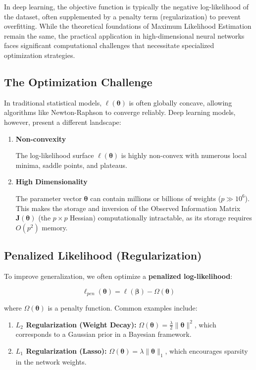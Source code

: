 \documentclass[
  letterpaper,
  DIV=11,
  numbers=noendperiod]{scrreprt}
\providecommand{\tightlist}{%
  \setlength{\itemsep}{0pt}\setlength{\parskip}{0pt}}
\renewcommand{\[}{\begin{equation}}
\renewcommand{\]}{\end{equation}}
\theoremstyle{definition}
\theoremstyle{plain}
\theoremstyle{plain}
\theoremstyle{plain}
\theoremstyle{definition}
\theoremstyle{plain}
\theoremstyle{remark}
\begin{document}
In deep learning, the objective function is typically the negative
log-likelihood of the dataset, often supplemented by a penalty term
(regularization) to prevent overfitting. While the theoretical
foundations of Maximum Likelihood Estimation remain the same, the
practical application in high-dimensional neural networks faces
significant computational challenges that necessitate specialized
optimization strategies.

\subsection{The Optimization
Challenge}\label{the-optimization-challenge}

In traditional statistical models, \(\ell(\boldsymbol{\theta})\) is
often globally concave, allowing algorithms like Newton-Raphson to
converge reliably. Deep learning models, however, present a different
landscape:

\begin{enumerate}
\def\labelenumi{\arabic{enumi}.}
\item
  \textbf{Non-convexity}

  The log-likelihood surface \(\ell(\boldsymbol{\theta})\) is highly
  non-convex with numerous local minima, saddle points, and plateaus.
\item
  \textbf{High Dimensionality}

  The parameter vector \(\boldsymbol{\theta}\) can contain millions or
  billions of weights (\(p \gg 10^6\)). This makes the storage and
  inversion of the Observed Information Matrix
  \(\mathbf{J}(\boldsymbol{\theta})\) (the \(p \times p\) Hessian)
  computationally intractable, as its storage requires \(O(p^2)\)
  memory.
\end{enumerate}

\subsection{Penalized Likelihood
(Regularization)}\label{penalized-likelihood-regularization}

To improve generalization, we often optimize a \textbf{penalized
log-likelihood}:

\[
\ell_{pen}(\boldsymbol{\theta}) = \ell(\boldsymbol{\beta}) - \Omega(\boldsymbol{\theta})
\]

where \(\Omega(\boldsymbol{\theta})\) is a penalty function. Common
examples include:

\begin{enumerate}
\def\labelenumi{\arabic{enumi}.}
\tightlist
\item
  \textbf{\(L_2\) Regularization (Weight Decay):}
  \(\Omega(\boldsymbol{\theta}) = \frac{\lambda}{2} \|\boldsymbol{\theta}\|^2\),
  which corresponds to a Gaussian prior in a Bayesian framework.
\item
  \textbf{\(L_1\) Regularization (Lasso):}
  \(\Omega(\boldsymbol{\theta}) = \lambda \|\boldsymbol{\theta}\|_1\),
  which encourages sparsity in the network weights.
\end{enumerate}
\end{document}

